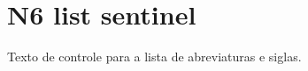 \documentclass{abntexto-ufc}
\begin{document}
\pretextual


\textual
\section{N6 list sentinel}
Texto de controle para a lista de abreviaturas e siglas.
\end{document}
